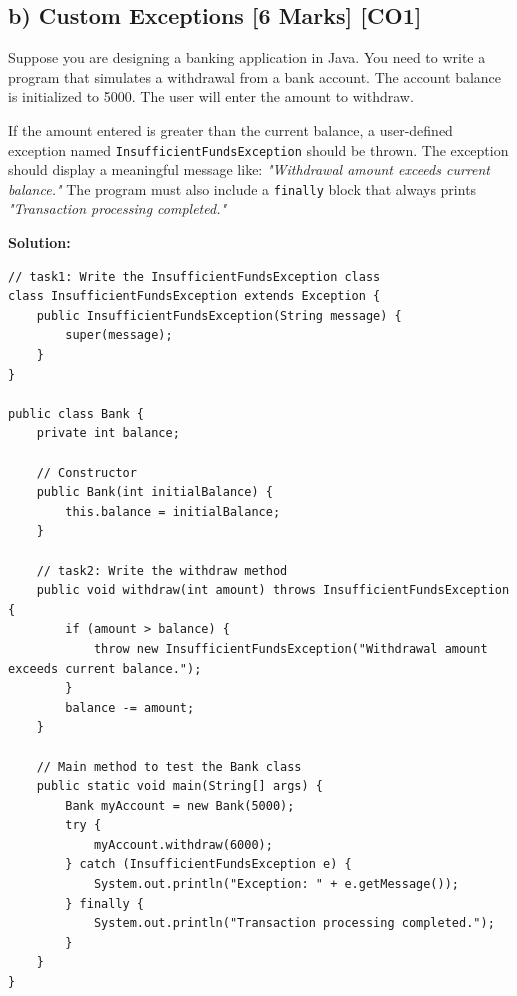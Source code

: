 \documentclass[11pt,a4paper]{article}
\begin{document}
\newpage
\subsection*{b) Custom Exceptions [6 Marks] [CO1]}
Suppose you are designing a banking application in Java. You need to write a program that simulates a withdrawal from a bank account. The account balance is initialized to 5000. The user will enter the amount to withdraw.

If the amount entered is greater than the current balance, a user-defined exception named \texttt{InsufficientFundsException} should be thrown. The exception should display a meaningful message like: \textit{"Withdrawal amount exceeds current balance."} The program must also include a \texttt{finally} block that always prints \textit{"Transaction processing completed."}

\noindent\textbf{Solution:}
\begin{lstlisting}
// task1: Write the InsufficientFundsException class
class InsufficientFundsException extends Exception {
    public InsufficientFundsException(String message) {
        super(message);
    }
}

public class Bank {
    private int balance;

    // Constructor
    public Bank(int initialBalance) {
        this.balance = initialBalance;
    }

    // task2: Write the withdraw method
    public void withdraw(int amount) throws InsufficientFundsException {
        if (amount > balance) {
            throw new InsufficientFundsException("Withdrawal amount exceeds current balance.");
        }
        balance -= amount;
    }

    // Main method to test the Bank class
    public static void main(String[] args) {
        Bank myAccount = new Bank(5000);
        try {
            myAccount.withdraw(6000);
        } catch (InsufficientFundsException e) {
            System.out.println("Exception: " + e.getMessage());
        } finally {
            System.out.println("Transaction processing completed.");
        }
    }
}
\end{lstlisting}
\vspace{0.6cm}

\end{document}
